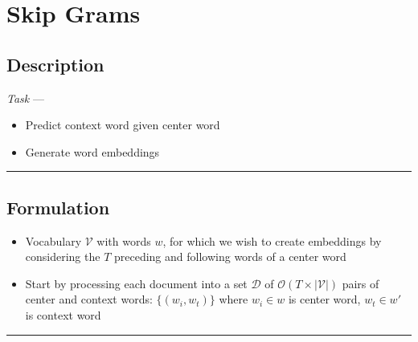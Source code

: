 \section{Skip Grams}
\subsection*{Description}
\emph{Task} --- 
\begin{itemize}
    \item Predict context word given center word
    \item Generate word embeddings
\end{itemize}

{\color{black}\hrule height 0.001mm}

\subsection*{Formulation}

\begin{itemize}
    \item Vocabulary $\mathcal{V}$ with words $w$, for which we wish to create embeddings by considering the $T$ preceding and following words of a center word
    \item Start by processing each document into a set $\mathcal{D}$ of $\mathcal{O}(T \times |\mathcal{V}|)$ pairs of center and context words:
    $
    \{(w_i, w_t)\}
    $
    where $w_i \in w$ is center word, $w_t\in w'$ is context word
\end{itemize}

{\color{black}\hrule height 0.001mm}

